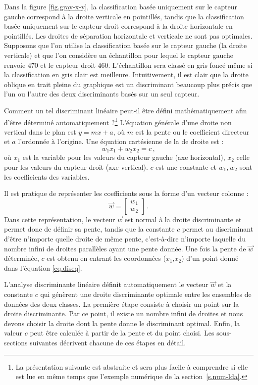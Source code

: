 Dans la figure \ref{fig.gray-x-y}, la classification basée uniquement sur le capteur gauche correspond à la droite verticale en pointillés, tandis que la classification basée uniquement sur le capteur droit correspond à la droite horizontale en pointillés. Les droites de séparation horizontale et verticale ne sont pas optimales. Supposons que l'on utilise la classification basée sur le capteur gauche (la droite verticale) et que l'on considère un échantillon pour lequel le capteur gauche renvoie $470$ et le capteur droit $460$. L'échantillon sera classé en gris foncé même si la classification en gris clair est meilleure. Intuitivement, il est clair que la droite oblique en trait pleine du graphique est un discriminant beaucoup plus précis que l'un ou l'autre des deux discriminants basés sur un seul capteur.

Comment un tel discriminant linéaire peut-il être défini mathématiquement afin d'être déterminé automatiquement ?\footnote{La présentation suivante est abstraite et sera plus facile à comprendre si elle est lue en même temps que l'exemple numérique de la section~\ref{s.num-lda}.} L'équation générale d'une droite non vertical dans le plan est $y=mx+a$, où $m$ est la pente ou le coefficient directeur et $a$ l’ordonnée à l’origine. Une équation cartésienne de la de droite est :
\begin{equation}
w_1x_1 + w_2x_2 = c\,,\label{eq.diseq}
\end{equation}
où $x_1$ est la variable pour les valeurs du capteur gauche (axe horizontal), $x_2$ celle pour les valeurs du capteur droit (axe vertical). $c$ est une constante et $w_1,w_2$ sont les coefficients des variables.

Il est pratique de représenter les coefficients sous la forme d'un vecteur colonne :
\[
\vec{w} = \left[ \begin{array}{c} w_1\\w_2 \end{array} \right]\,.
\]
Dans cette représentation, le vecteur $\vec{w}$ est normal à la droite discriminante et permet donc de définir sa pente, tandis que la constante $c$ permet au discriminant d'être n'importe quelle droite de même pente, c'est-à-dire n'importe laquelle du nombre infini de droites parallèles ayant une pente donnée. Une fois la pente de $\vec{w}$ déterminée, $c$ est obtenu en entrant  les coordonnées ($x_1$,$x_2$) d'un point donné dans l'équation \ref{eq.diseq}.

L'analyse discriminante linéaire définit automatiquement le vecteur $\vec{w}$ et la constante $c$ qui génèrent une droite discriminante optimale entre les ensembles de données des deux classes. La première étape consiste à choisir un point sur la droite discriminante. Par ce point, il existe un nombre infini de droites et nous devons choisir la droite dont la pente donne le discriminant optimal. Enfin, la valeur $c$ peut être calculée à partir de la pente et du point choisi. Les sous-sections suivantes décrivent chacune de ces étapes en détail.

